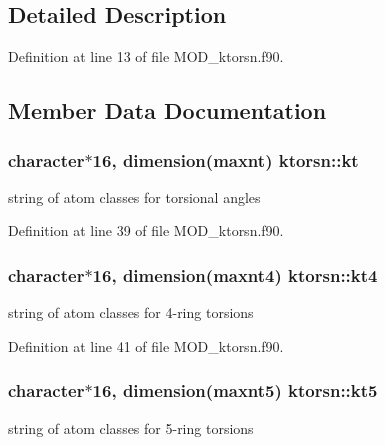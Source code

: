 \subsection{Detailed Description}


Definition at line 13 of file M\-O\-D\-\_\-ktorsn.\-f90.



\subsection{Member Data Documentation}
\hypertarget{classktorsn_a820875b0da7d7e0bbe8a8ac513009784}{
\subsubsection[{kt}]{\setlength{\rightskip}{0pt plus 5cm}character$\ast$16, dimension({\bf maxnt}) ktorsn\-::kt}}\label{classktorsn_a820875b0da7d7e0bbe8a8ac513009784}


string of atom classes for torsional angles 



Definition at line 39 of file M\-O\-D\-\_\-ktorsn.\-f90.

\hypertarget{classktorsn_a0930cb53cbd4f62e40a7af7518449ef8}{
\subsubsection[{kt4}]{\setlength{\rightskip}{0pt plus 5cm}character$\ast$16, dimension({\bf maxnt4}) ktorsn\-::kt4}}\label{classktorsn_a0930cb53cbd4f62e40a7af7518449ef8}


string of atom classes for 4-\/ring torsions 



Definition at line 41 of file M\-O\-D\-\_\-ktorsn.\-f90.

\hypertarget{classktorsn_a91ee3474936fcbf35dea760f305ec374}{
\subsubsection[{kt5}]{\setlength{\rightskip}{0pt plus 5cm}character$\ast$16, dimension({\bf maxnt5}) ktorsn\-::kt5}}\label{classktorsn_a91ee3474936fcbf35dea760f305ec374}


string of atom classes for 5-\/ring torsions 



